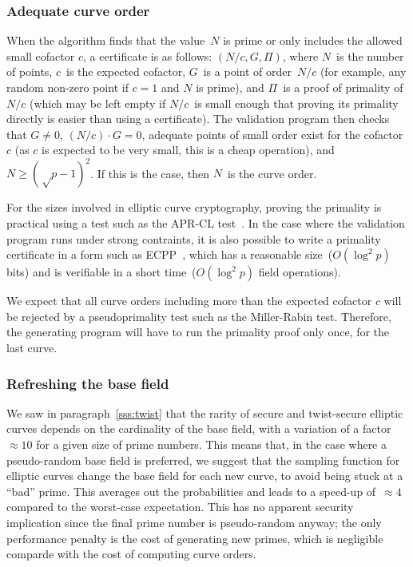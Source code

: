 \documentclass[twocolumn,letterpaper,10pt]{article}
\begin{document}
\subsubsection{Adequate curve order}

When the algorithm finds that the value~$N$ is prime
or only includes the allowed small cofactor $c$,
a certificate is as follows: $(N/c, G, Π)$,
where $N$~is the number of points, $c$~is the expected cofactor,
$G$~is a point of order~$N/c$
(for example, any random non-zero point if $c = 1$ and $N$ is prime),
and $Π$~is a proof of primality of~$N/c$
(which may be left empty if $N/c$~is small enough
that proving its primality directly is easier than using a certificate).
The validation program then checks that $G ≠ 0$,
$(N/c) · G = 0$, adequate points of small order exist for the cofactor $c$
(as $c$ is expected to be very small, this is a cheap operation),
and~$N ≥ (√p-1)^2$.
If this is the case, then $N$~is the curve order.

For the sizes involved in elliptic curve cryptography,
proving the primality is practical using a test such as
the APR-CL test~\cite{fcs1980adleman,mc1984cl}.
In the case where the validation program runs under strong contraints,
it is also possible to write a primality certificate
in a form such as ECPP~\cite{mc1993am},
which has a reasonable size~($O(\log^2 p)$ bits)
and is verifiable in a short time~($O(\log^2 p)$ field operations).

We expect that all curve orders including more than the expected cofactor $c$
will be rejected by a pseudoprimality test such as the Miller-Rabin test.
Therefore, the generating program will have to run the primality proof
only once, for the last curve.

\subsubsection{Refreshing the base field}

We saw in paragraph~\ref{sss:twist} that the rarity of
secure and twist-secure elliptic curves depends on the
cardinality of the base field,
with a variation of a factor~$≈ 10$ for a given size of prime numbers.
This means that,
in the case where a pseudo-random base field is preferred,
we suggest that
the sampling function for elliptic curves change the base field
for each new curve, to avoid being stuck at a ``bad'' prime.
This averages out the probabilities
and leads to a speed-up of~$≈ 4$ compared to the worst-case expectation.
This has no apparent security implication
since the final prime number is pseudo-random anyway;
the only performance penalty is the cost of generating new primes,
which is negligible comparde with the cost of computing curve orders.
\end{document}
